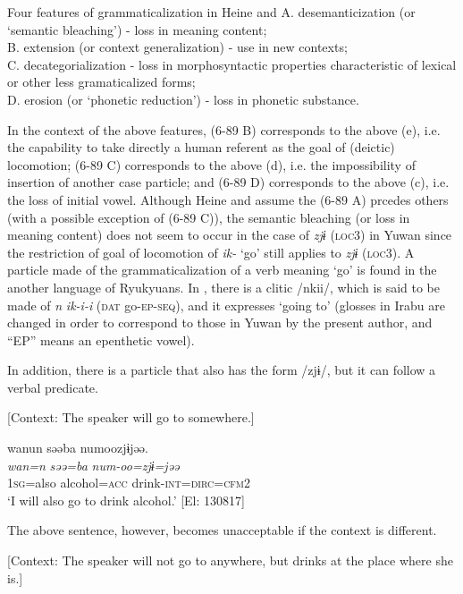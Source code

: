 \ea\label{ex:6-89}
 Four features of grammaticalization in Heine and \citet[2]{Kuteva2002}
A.  desemanticization (or ‘semantic bleaching’) - loss in meaning content;\\
B.  extension (or context generalization) - use in new contexts;\\
C.    decategorialization - loss in morphosyntactic properties characteristic of lexical or other less gramaticalized forms;\\
D.  erosion (or ‘phonetic reduction’) - loss in phonetic substance.
\z

In the context of the above features, (6-89 B) corresponds to the above (e), i.e. the capability to take directly a human referent as the goal of (deictic) locomotion; (6-89 C) corresponds to the above (d), i.e. the impossibility of insertion of another case particle; and (6-89 D) corresponds to the above (c), i.e. the loss of initial vowel. Although Heine and \citet[3]{Kuteva2002} assume the (6-89 A) prcedes others (with a possible exception of (6-89 C)), the semantic bleaching (or loss in meaning content) does not seem to occur in the case of \textit{zjɨ} (\textsc{loc3}) in Yuwan since the restriction of goal of locomotion of \textit{ik-} ‘go’ still applies to \textit{zjɨ} (\textsc{loc3}). A particle made of the grammaticalization of a verb meaning ‘go’ is found in the another language of Ryukyuans. In \citet[207]{Shimoji2008}, there is a clitic /nkii/, which is said to be made of \textit{n} \textit{ik-i-i} (\textsc{dat} go-\textsc{ep}-\textsc{seq}), and it expresses ‘going to’ (glosses in Irabu are changed in order to correspond to those in Yuwan by the present author, and “EP” means an epenthetic vowel).

  In addition, there is a particle that also has the form /zjɨ/, but it can follow a verbal predicate.

\ea\label{ex:6-90}
  [Context: The speaker will go to somewhere.]

{\TM}
\glll wanun  səəba  numoozjɨjəə.\\
\textit{wan=n}  \textit{səə=ba}  \textit{num-oo=zjɨ=jəə}\\
    1\textsc{sg}=also  alcohol=\textsc{acc}  drink-\textsc{int}=\textsc{dirc}=\textsc{cfm}2\\
\glt    ‘I will also go to drink alcohol.’ [El: 130817]

The above sentence, however, becomes unacceptable if the context is different.

\ea\label{ex:6-91}
  [Context: The speaker will not go to anywhere, but drinks at the place where she is.]

